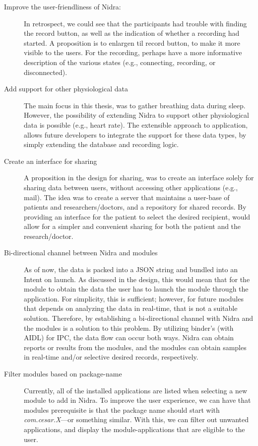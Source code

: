\begin{description}
    \item[Improve the user-friendliness of Nidra:] In retrospect, we could see that the participants had trouble with finding the record button, as well as the indication of whether a recording had started. A proposition is to enlargen til record button, to make it more visible to the users. For the recording, perhaps have a more informative description of the various states (e.g., connecting, recording, or disconnected). 
    \item[Add support for other physiological data] The main focus in this thesis, was to gather breathing data during sleep. However, the possibility of extending Nidra to support other physiological data is possible (e.g., heart rate). The extensible approach to application, allows future developers to integrate the support for these data types, by simply extending the database and recording logic. 
    \item[Create an interface for sharing] A proposition in the design for sharing, was to create an interface solely for sharing data between users, without accessing other applications (e.g., mail). The idea was to create a server that maintains a user-base of patients and researchers/doctors, and a repository for shared records. By providing an interface for the patient to select the desired recipient, would allow for a simpler and convenient sharing for both the patient and the research/doctor. 
    \item[Bi-directional channel between Nidra and modules] As of now, the data is packed into a JSON string and bundled into an Intent on launch. As discussed in the design, this would mean that for the module to obtain the data the user has to launch the module through the application. For simplicity, this is sufficient; however, for future modules that depends on analyzing the data in real-time, that is not a suitable solution. Therefore, by establishing a bi-directional channel with Nidra and the modules is a solution to this problem. By utilizing binder's (with AIDL) for IPC, the data flow can occur both ways. Nidra can obtain reports or results from the modules, and the modules can obtain samples in real-time and/or selective desired records, respectively. 
    \item[Filter modules based on package-name] Currently, all of the installed applications are listed when selecting a new module to add in Nidra. To improve the user experience, we can have that modules prerequisite is that the package name should start with \textit{com.cesar.X}---or something similar. With this, we can filter out unwanted applications, and display the module-applications that are eligible to the user.
\end{description}